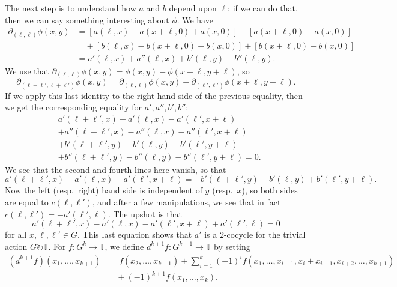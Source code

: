\documentclass[reqno]{amsart} 
\numberwithin{theorem}{section}
\numberwithin{equation}{section}
\begin{document}
The next step is to understand how $a$ and $b$ depend upon $\ell$; if we can do that, then we can say something interesting about $\phi$.  We have
\begin{align*}
  \partial_{(\ell, \ell)} \phi(x, y) &=[a(\ell, x) - a(x + \ell, 0) + a(x, 0)] +[a(x + \ell, 0) - a(x, 0)] \\
                     &\quad +[b(\ell, x) - b(x + \ell, 0) + b(x, 0)] +[b(x + \ell, 0) - b(x, 0)] \\
                     &= a '(\ell, x) + a ''(\ell, x) + b '(\ell, y) + b ''(\ell, y).
\end{align*}
We use that $\partial_{(\ell, \ell)} \phi(x, y) = \phi(x, y) - \phi(x + \ell, y + \ell)$, so
\begin{equation*}
  \partial_{(\ell + \ell ', \ell + \ell ')} \phi(x, y) = \partial_{(\ell, \ell)} \phi(x, y) + \partial_{(\ell ', \ell ')} \phi(x + \ell, y + \ell).
\end{equation*}
If we apply this last identity to the right hand side of the previous equality, then we get the corresponding equality for $a', a'', b', b''$:
\begin{align*}
  &a '(\ell + \ell ', x) - a'(\ell, x) - a '(\ell ', x + \ell)
  \\ &+ a''(\ell + \ell ', x) - a''(\ell, x) - a''(\ell ', x + \ell)
  \\
  &+ b'(\ell + \ell ', y) - b'(\ell, y) - b'(\ell ', y + \ell) \\
  &+ b''(\ell + \ell ', y) - b''(\ell, y) - b''(\ell ', y + \ell) = 0.
\end{align*}
We see that the second and fourth lines here vanish, so that
\begin{equation*}
  a '(\ell + \ell ', x) - a'(\ell, x) - a '(\ell ', x + \ell)
  =
  -b'(\ell + \ell ', y) + b'(\ell, y) + b'(\ell ', y + \ell).
\end{equation*}
Now the left (resp.\ right) hand side is independent of $y$ (resp.\ $x$), so both sides are equal to $c(\ell, \ell ')$, and after a few manipulations, we see that in fact $c(\ell, \ell ') = - a'(\ell ', \ell)$.  The upshot is that
\begin{equation*}
  a '(\ell + \ell ', x) - a'(\ell, x)
  - a'(\ell ', x + \ell)
  + a'(\ell ', \ell) = 0
\end{equation*}
for all $x, \ell, \ell ' \in G$.  This last equation shows that $a'$ is a $2$-cocycle for the trivial action $G \circlearrowright \mathbb{T}$.  For $f : G^k \rightarrow \mathbb{T}$, we define $d^{k + 1} f : G^{k + 1} \rightarrow \mathbb{T}$ by setting
\begin{align*}
  (d^{k + 1} f)(x_1, \dotsc, x_{k + 1})
  &= f(x_2, \dotsc, x_{k + 1})
    + \sum_{i = 1}^k(- 1)^i f(x_1, \dotsc, x_{i - 1}, x_i + x_{i + 1}, x_{i + 2}, \dotsc, x_{k + 1}) \\
  &\quad +(- 1)^{k + 1} f(x_1, \dotsc, x_k).
\end{align*}
\end{document}
